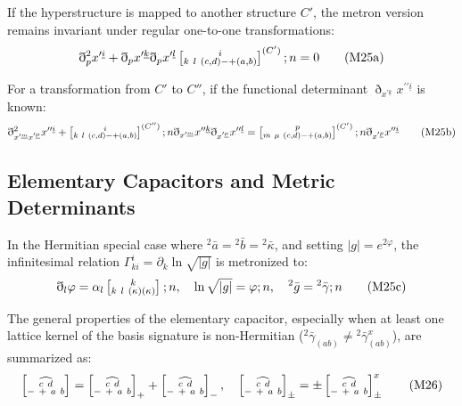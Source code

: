 \documentclass[11pt,a4paper,oneside]{article}
\newcommand{\ethop}{\eth}
\newcommand{\metroncap}[4][]{%
    \left[ \renewcommand{\arraystretch}{0.85} \substack{#2 \\ #3 \ #4} \right]_{#1}%
}
\begin{document}
If the hyperstructure is mapped to another structure $C'$, the metron version remains invariant under regular one-to-one transformations:
\begin{equation}
    \ethop^2_p x^{\prime \underline{i}} + \ethop_p x^{\prime \underline{k}} \ethop_p x^{\prime \underline{l}} \metroncap{i}{k\ l}{(c,d) - + (a,b)}^{(C')}; n = 0 \tag{M25a}
\end{equation}

For a transformation from $C'$ to $C''$, if the functional determinant $\ethop_{x^{\prime \underline{k}}} x^{\prime \prime \underline{i}}$ is known:
\begin{equation}
    \ethop^2_{x^{\prime \underline{m}} x^{\prime \underline{\mu}}} x^{\prime \prime \underline{i}} + \metroncap{i}{k\ l}{(c,d) - + (a,b)}^{(C'')}; n \ethop_{x^{\prime \underline{m}}} x^{\prime \prime \underline{k}} \ethop_{x^{\prime \underline{\mu}}} x^{\prime \prime \underline{l}} = \metroncap{p}{m\ \mu}{(c,d) - + (a,b)}^{(C')}; n \ethop_{x^{\prime \underline{p}}} x^{\prime \prime \underline{i}} \tag{M25b}
\end{equation}

\subsection{Elementary Capacitors and Metric Determinants}

In the Hermitian special case where $^2\bar{a} = {}^2\bar{b} = {}^2\bar{\kappa}$, and setting $|g| = e^{2\varphi}$, the infinitesimal relation $\Gamma^i_{ki} = \partial_k \ln \sqrt{|g|}$ is metronized to:
\begin{equation}
    \ethop_l \varphi = \alpha_l \metroncap{k}{k\ l}{(\kappa)(\kappa)}; n, \quad \ln \sqrt{|g|} = \varphi; n, \quad {}^2\bar{g} = {}^2\bar{\gamma}; n \tag{M25c}
\end{equation}

The general properties of the elementary capacitor, especially when at least one lattice kernel of the basis signature is non-Hermitian ($^2\bar{\gamma}_{(ab)} \neq {}^2\bar{\gamma}_{(ab)}^x$), are summarized as:
\begin{equation}
    \metroncap{\widehat{c \ d}}{- \ +}{a \ b} = 
    \metroncap[+]{\widehat{c \ d}}{- \ +}{a \ b} + 
    \metroncap[-]{\widehat{c \ d}}{- \ +}{a \ b} , \quad 
    \metroncap[\pm]{\widehat{c \ d}}{- \ +}{a \ b} = 
    \pm \metroncap[\pm]{\widehat{c \ d}}{- \ +}{a \ b}^x \tag{M26}
\end{equation}
\end{document}
